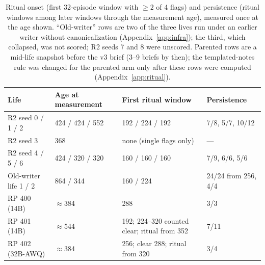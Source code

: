 \documentclass{article}
\begin{document}
\begin{table}[t]
\centering
\small
\caption{Ritual onset (first 32-episode window with $\ge 2$ of 4 flags) and persistence (ritual windows among later windows through the measurement age), measured once at the age shown. ``Old-writer'' rows are two of the three lives run under an earlier writer without canonicalization (Appendix~\ref{app:infra}); the third, which collapsed, was not scored; R2 seeds 7 and 8 were unscored. Parented rows are a mid-life snapshot before the v3 brief (3--9 briefs by then); the templated-notes rule was changed for the parented arm only after these rows were computed (Appendix~\ref{app:ritual}).}
\label{tab:ritual}
\footnotesize
\setlength{\tabcolsep}{4pt}
\begin{tabular}{llp{4.2cm}l}
\toprule
Life & Age at measurement & First ritual window & Persistence \\
\midrule
R2 seed 0 / 1 / 2 & 424 / 424 / 552 & 192 / 224 / 192 & 7/8, 5/7, 10/12 \\
R2 seed 3 & 368 & none (single flags only) & --- \\
R2 seed 4 / 5 / 6 & 424 / 320 / 320 & 160 / 160 / 160 & 7/9, 6/6, 5/6 \\
Old-writer life 1 / 2 & 864 / 344 & 160 / 224 & 24/24 from 256, 4/4 \\
\midrule
RP 400 (14B) & $\approx$384 & 288 & 3/3 \\
RP 401 (14B) & $\approx$544 & 192; 224--320 counted clear; ritual from 352 & 7/11 \\
RP 402 (32B-AWQ) & $\approx$384 & 256; clear 288; ritual from 320 & 3/4 \\
\bottomrule
\end{tabular}
\end{table}
\end{document}
